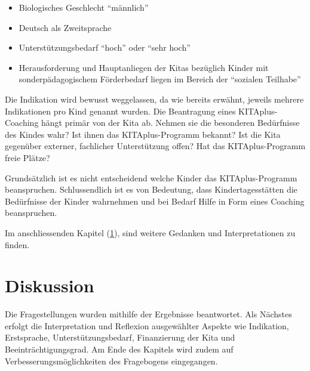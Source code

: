 \documentclass[
  ngerman,
  11pt,
  paper=a4,
  twoside,
  titlepage=true,
  openright,
  abstract=on,
  toc=listofnumbered,
  numbers=noenddot,
  chapterprefix=true,
  headings=optiontohead,
  svgnames,
  dvipsnames]{scrreprt}
\providecommand{\tightlist}{%
  \setlength{\itemsep}{0pt}\setlength{\parskip}{0pt}}
\begin{document}
\begin{itemize}
\tightlist
\item
  Biologisches Geschlecht “männlich”
\item
  Deutsch als Zweitsprache
\item
  Unterstützungsbedarf “hoch” oder “sehr hoch”
\item
  Herausforderung und Hauptanliegen der Kitas bezüglich Kinder mit
  sonderpädagogischem Förderbedarf liegen im Bereich der “sozialen
  Teilhabe”
\end{itemize}

Die Indikation wird bewusst weggelassen, da wie bereits erwähnt, jeweils
mehrere Indikationen pro Kind genannt wurden. Die Beantragung eines
KITAplus-Coaching hängt primär von der Kita ab. Nehmen sie die
besonderen Bedürfnisse des Kindes wahr? Ist ihnen das KITAplus-Programm
bekannt? Ist die Kita gegenüber externer, fachlicher Unterstützung
offen? Hat das KITAplus-Programm freie Plätze?

Grundsätzlich ist es nicht entscheidend welche Kinder das
KITAplus-Programm beanspruchen. Schlussendlich ist es von Bedeutung,
dass Kindertagesstätten die Bedürfnisse der Kinder wahrnehmen und bei
Bedarf Hilfe in Form eines Coaching beanspruchen.

Im anschliessenden Kapitel (\cref{sec:diskussion}), sind weitere
Gedanken und Interpretationen zu finden.

\hypertarget{sec:diskussion}{%
\chapter{Diskussion}\label{sec:diskussion}}

Die Fragestellungen wurden mithilfe der Ergebnisse beantwortet. Als
Nächstes erfolgt die Interpretation und Reflexion ausgewählter Aspekte
wie Indikation, Erstsprache, Unterstützungsbedarf, Finanzierung der Kita
und Beeinträchtigungsgrad. Am Ende des Kapitels wird zudem auf
Verbesserungsmöglichkeiten des Fragebogens eingegangen.
\end{document}

